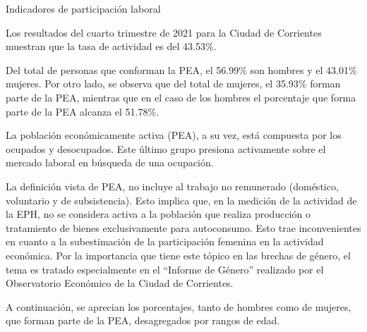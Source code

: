 \documentclass[
]{article}
\begin{document}
\pagebreak

\newpage

\textcolor{graycustom}{\Large Indicadores de participación laboral}
\newline

Los resultados del cuarto trimestre de 2021 para la Ciudad de Corrientes
muestran que la tasa de actividad es del 43.53\%.

Del total de personas que conforman la PEA, el 56.99\% son hombres y el
43.01\% mujeres. Por otro lado, se observa que del total de mujeres, el
35.93\% forman parte de la PEA, mientras que en el caso de los hombres
el porcentaje que forma parte de la PEA alcanza el 51.78\%.

La población económicamente activa (PEA), a su vez, está compuesta por
los ocupados y desocupados. Este último grupo presiona activamente sobre
el mercado laboral en búsqueda de una ocupación.

La definición vista de PEA, no incluye al trabajo no remunerado
(doméstico, voluntario y de subsistencia). Esto implica que, en la
medición de la actividad de la EPH, no se considera activa a la
población que realiza producción o tratamiento de bienes exclusivamente
para autoconsumo. Esto trae inconvenientes en cuanto a la subestimación
de la participación femenina en la actividad económica. Por la
importancia que tiene este tópico en las brechas de género, el tema es
tratado especialmente en el ``Informe de Género'' realizado por el
Observatorio Económico de la Ciudad de Corrientes.

A continuación, se aprecian los porcentajes, tanto de hombres como de
mujeres, que forman parte de la PEA, desagregados por rangos de edad.
\end{document}
